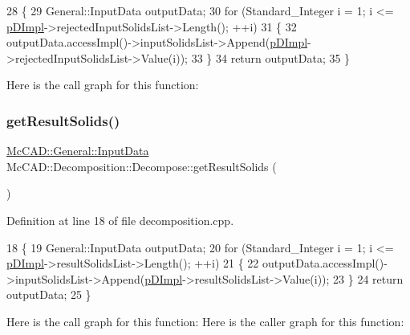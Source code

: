 \begin{DoxyCode}
28                                               \{
29   General::InputData outputData;
30   \textcolor{keywordflow}{for} (Standard\_Integer i = 1; i <= \hyperlink{classMcCAD_1_1Decomposition_1_1Decompose_aa39ced95c033a2a77e4fe2c60ad8427c}{pDImpl}->rejectedInputSolidsList->Length(); ++i)
31     \{
32       outputData.accessImpl()->inputSolidsList->Append(\hyperlink{classMcCAD_1_1Decomposition_1_1Decompose_aa39ced95c033a2a77e4fe2c60ad8427c}{pDImpl}->rejectedInputSolidsList->Value(i));
33     \}
34   \textcolor{keywordflow}{return} outputData;
35 \}
\end{DoxyCode}
Here is the call graph for this function\+:
\mbox{\label{classMcCAD_1_1Decomposition_1_1Decompose_a5db8eec150047c16365cf090d2ec0cdf}} 
\subsubsection{\texorpdfstring{get\+Result\+Solids()}{getResultSolids()}\hspace{0.1cm}{\footnotesize\ttfamily [1/2]}}
{\footnotesize\ttfamily \hyperlink{classMcCAD_1_1General_1_1InputData}{Mc\+C\+A\+D\+::\+General\+::\+Input\+Data} Mc\+C\+A\+D\+::\+Decomposition\+::\+Decompose\+::get\+Result\+Solids (\begin{DoxyParamCaption}{ }\end{DoxyParamCaption})}



Definition at line 18 of file decomposition.\+cpp.


\begin{DoxyCode}
18                                             \{
19   General::InputData outputData;
20   \textcolor{keywordflow}{for} (Standard\_Integer i = 1; i <= \hyperlink{classMcCAD_1_1Decomposition_1_1Decompose_aa39ced95c033a2a77e4fe2c60ad8427c}{pDImpl}->resultSolidsList->Length(); ++i)
21     \{
22       outputData.accessImpl()->inputSolidsList->Append(\hyperlink{classMcCAD_1_1Decomposition_1_1Decompose_aa39ced95c033a2a77e4fe2c60ad8427c}{pDImpl}->resultSolidsList->Value(i));
23     \}
24   \textcolor{keywordflow}{return} outputData;
25 \}
\end{DoxyCode}
Here is the call graph for this function\+:
Here is the caller graph for this function\+:
\mbox{\label{classMcCAD_1_1Decomposition_1_1Decompose_a6da380718a3f2b83a99a949f63ab60c0}} 
